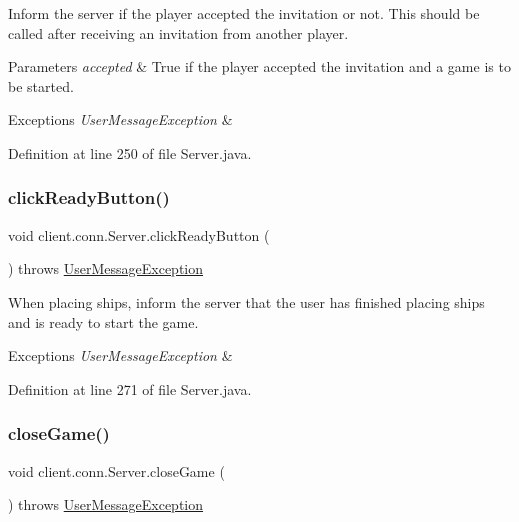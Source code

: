 Inform the server if the player accepted the invitation or not. This should be called after receiving an invitation from another player. 
\begin{DoxyParams}{Parameters}
{\em accepted} & True if the player accepted the invitation and a game is to be started. \\
\hline
\end{DoxyParams}

\begin{DoxyExceptions}{Exceptions}
{\em User\+Message\+Exception} & \\
\hline
\end{DoxyExceptions}


Definition at line 250 of file Server.\+java.

\hypertarget{classclient_1_1conn_1_1_server_a7e54680c0fb053bee969c41f093aa5c4}{}\label{classclient_1_1conn_1_1_server_a7e54680c0fb053bee969c41f093aa5c4} 
\subsubsection{\texorpdfstring{click\+Ready\+Button()}{clickReadyButton()}}
{\footnotesize\ttfamily void client.\+conn.\+Server.\+click\+Ready\+Button (\begin{DoxyParamCaption}{ }\end{DoxyParamCaption}) throws \hyperlink{classsharedlib_1_1exceptions_1_1_user_message_exception}{User\+Message\+Exception}}

When placing ships, inform the server that the user has finished placing ships and is ready to start the game. 
\begin{DoxyExceptions}{Exceptions}
{\em User\+Message\+Exception} & \\
\hline
\end{DoxyExceptions}


Definition at line 271 of file Server.\+java.

\hypertarget{classclient_1_1conn_1_1_server_a5d1f1961306d3e06c895abc90dfddf9f}{}\label{classclient_1_1conn_1_1_server_a5d1f1961306d3e06c895abc90dfddf9f} 
\subsubsection{\texorpdfstring{close\+Game()}{closeGame()}}
{\footnotesize\ttfamily void client.\+conn.\+Server.\+close\+Game (\begin{DoxyParamCaption}{ }\end{DoxyParamCaption}) throws \hyperlink{classsharedlib_1_1exceptions_1_1_user_message_exception}{User\+Message\+Exception}}

